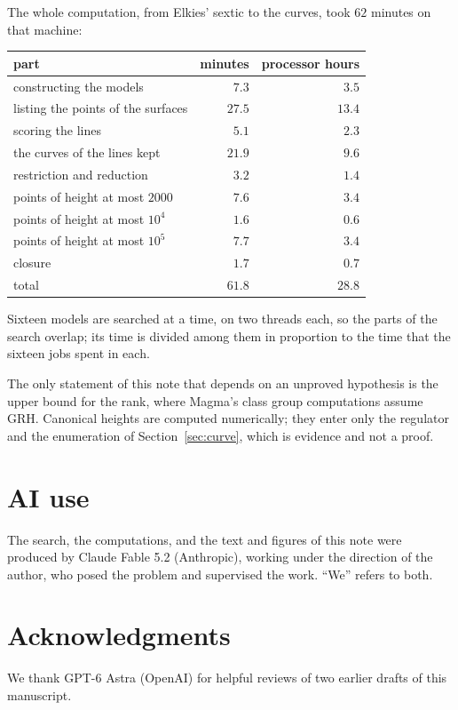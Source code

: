 \documentclass[11pt]{article}
\theoremstyle{remark}
\begin{document}
The whole computation, from Elkies' sextic to the curves, took $62$ minutes on that machine:
\begin{center}\small
\begin{tabular}{lrr}
\toprule
part & minutes & processor hours\\
\midrule
constructing the models & $7.3$ & $3.5$\\
listing the points of the surfaces & $27.5$ & $13.4$\\
scoring the lines & $5.1$ & $2.3$\\
the curves of the lines kept & $21.9$ & $9.6$\\
\quad restriction and reduction & $3.2$ & $1.4$\\
\quad points of height at most $2000$ & $7.6$ & $3.4$\\
\quad points of height at most $10^4$ & $1.6$ & $0.6$\\
\quad points of height at most $10^5$ & $7.7$ & $3.4$\\
\quad closure & $1.7$ & $0.7$\\
\midrule
total & $61.8$ & $28.8$\\
\bottomrule
\end{tabular}
\end{center}
Sixteen models are searched at a time, on two threads each, so the parts of the search overlap; its time is divided among them
in proportion to the time that the sixteen jobs spent in each.

The only statement of this note that depends on an unproved hypothesis is the upper bound for the rank, where Magma's class group
computations assume GRH.  Canonical heights are computed numerically; they enter only the regulator and the enumeration of
Section~\ref{sec:curve}, which is evidence and not a proof.

\section*{AI use}
The search, the computations, and the text and figures of this note were produced by Claude Fable 5.2 (Anthropic), working under
the direction of the author, who posed the problem and supervised the work.  ``We'' refers to both.

\section*{Acknowledgments}
We thank GPT-6 Astra (OpenAI) for helpful reviews of two earlier drafts of this manuscript.
\end{document}
